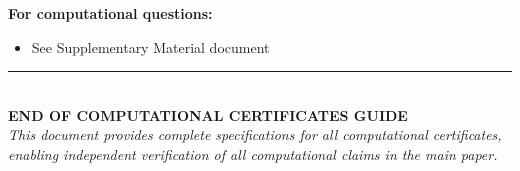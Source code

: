 \documentclass[11pt,a4paper]{article}
\theoremstyle{definition}
\begin{document}
\textbf{For computational questions:}
\begin{itemize}
    \item See Supplementary Material document
\end{itemize}


\vspace{2cm}

\begin{center}
\rule{\textwidth}{0.4pt}
\\[0.5cm]
\Large\textbf{END OF COMPUTATIONAL CERTIFICATES GUIDE}
\\[0.3cm]
\normalsize
\textit{This document provides complete specifications for all computational certificates,}\\
\textit{enabling independent verification of all computational claims in the main paper.}
\end{center}
\end{document}
